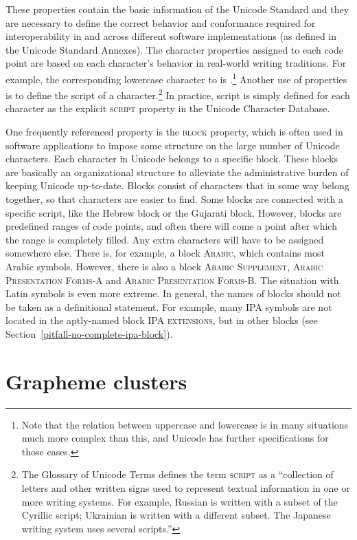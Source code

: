 These properties contain the basic information of the Unicode Standard and they
are necessary to define the correct behavior and conformance required for
interoperability in and across different software implementations (as defined in
the Unicode Standard Annexes). The character properties assigned to each code
point are based on each character's behavior in real-world writing
traditions. For example, the corresponding lowercase character to  is
.\footnote{Note that the relation between uppercase and lowercase is in
many situations much more complex than this, and Unicode has further
specifications for those cases.} Another use of properties is to define the
script of a character.\footnote{The Glossary of Unicode Terms defines the term \textsc{script} as
a ``collection of letters and other written signs used to represent textual
information in one or more writing systems. For example, Russian is written with
a subset of the Cyrillic script; Ukrainian is written with a different subset.
The Japanese writing system uses several scripts.''} In practice, script is
simply defined for each character as the explicit \textsc{script} property in
the Unicode Character Database.

One frequently referenced property is the \textsc{block} property, which is
often used in software applications to impose some structure on the large number
of Unicode characters. Each character in Unicode belongs to a specific block.
These blocks are basically an organizational structure to alleviate the
administrative burden of keeping Unicode up-to-date. Blocks consist of
characters that in some way belong together, so that characters are easier to
find. Some blocks are connected with a specific script, like the Hebrew block or
the Gujarati block. However, blocks are predefined ranges of code points, and
often there will come a point after which the range is completely filled. Any
extra characters will have to be assigned somewhere else. There is, for example,
a block \textsc{Arabic}, which contains most Arabic symbols. However, there is
also a block \textsc{Arabic Supplement}, \textsc{Arabic Presentation Forms-A}
and \textsc{Arabic Presentation Forms-B}. The situation with Latin symbols is
even more extreme. In general, the names of blocks should not be taken as a
definitional statement. For example, many IPA symbols are not located in the
aptly-named block \textsc{IPA extensions}, but in other blocks
(see Section~\ref{pitfall-no-complete-ipa-block}).

\section{Grapheme clusters}

